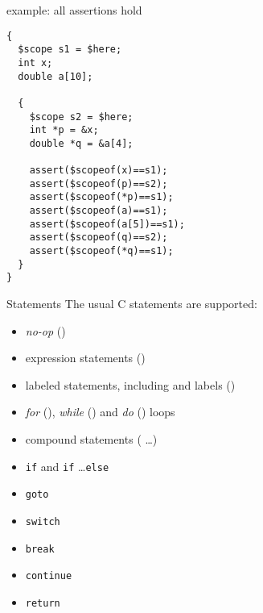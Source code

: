 \documentclass[t]{beamer}
\begin{document}
\begin{frame}[containsverbatim]{\cscopeof{} example: all assertions hold}
  \begin{small}
\begin{verbatim}
{
  $scope s1 = $here;
  int x;
  double a[10];

  {
    $scope s2 = $here;
    int *p = &x;
    double *q = &a[4];

    assert($scopeof(x)==s1);
    assert($scopeof(p)==s2);
    assert($scopeof(*p)==s1);
    assert($scopeof(a)==s1);
    assert($scopeof(a[5])==s1);
    assert($scopeof(q)==s2);
    assert($scopeof(*q)==s1);
  }
}  
\end{verbatim}
  \end{small}
\end{frame}

\begin{frame}[containsverbatim]{Statements}
  The usual C statements are supported:
  \begin{itemize}
  \item \emph{no-op} (\ct{;})
  \item expression statements ()
  \item labeled statements, including  and  labels
    ()
  \item \emph{for} (), \emph{while} 
    () and \emph{do} ()
    loops
  \item compound statements (\lb {} \ldots \rb)
  \item \texttt{if} and \verb!if! \ldots \verb!else!
  \item \verb!goto!
  \item \verb!switch!
  \item \verb!break!
  \item \verb!continue!
  \item \verb!return!
  \end{itemize}
\end{frame}
\end{document}
